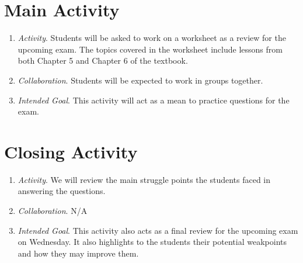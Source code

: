 \documentclass[11pt]{article}
\begin{document}
\section{\centering Main Activity}
	\begin{enumerate}
		\item \textit{Activity}. Students will be asked to work on a worksheet as a review for the upcoming exam. The topics covered in the worksheet include
						lessons from both Chapter 5 and Chapter 6 of the textbook.
		\item \textit{Collaboration}. Students will be expected to work in groups together.
		\item \textit{Intended Goal}. This activity will act as a mean to practice questions for the exam.
	\end{enumerate}

\section{\centering Closing Activity}
	\begin{enumerate}
		\item \textit{Activity}. We will review the main struggle points the students faced in answering the questions.
		\item \textit{Collaboration}. N/A
		\item \textit{Intended Goal}. This activity also acts as a final review for the upcoming exam on Wednesday. It also highlights to the students their 
							potential weakpoints and how they may improve them.
	\end{enumerate}
\end{document}
